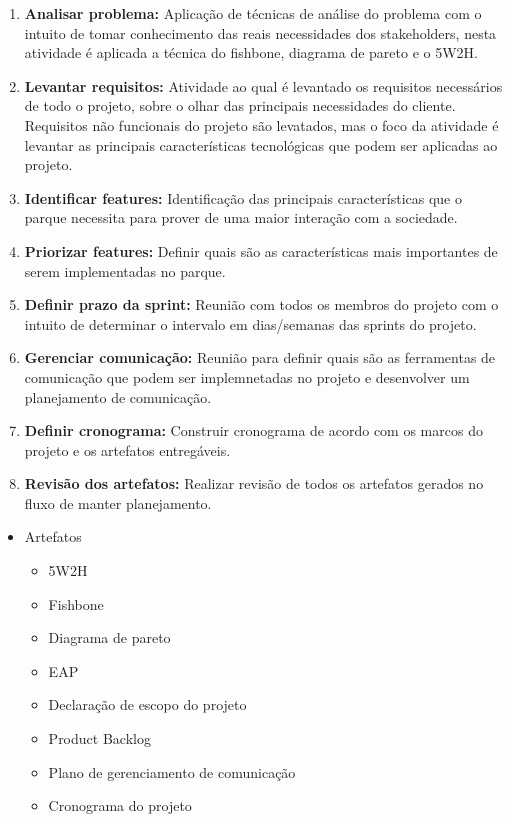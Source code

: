 \begin{enumerate}
	\item \textbf{Analisar problema:}  
	Aplicação de técnicas de análise do problema com o intuito de tomar conhecimento das reais necessidades dos stakeholders, nesta atividade é aplicada a técnica do fishbone, diagrama de pareto e o 5W2H.
	\item \textbf{Levantar requisitos:} 
	Atividade ao qual é levantado os requisitos necessários de todo o projeto, sobre o olhar das principais necessidades do cliente. Requisitos não funcionais do projeto são levatados, mas o foco da atividade é levantar as principais características tecnológicas que podem ser aplicadas ao projeto.
	\item \textbf{Identificar features:} 
	Identificação das principais características que o parque necessita para prover de uma maior interação com a sociedade. 
	\item \textbf{Priorizar features:} 
	Definir quais são as características mais importantes de serem implementadas no parque.
	\item \textbf{Definir prazo da sprint:} 
	Reunião com todos os membros do projeto com o intuito de determinar o intervalo em dias/semanas das sprints do projeto. 
	\item \textbf{Gerenciar comunicação:} 
	Reunião para definir quais são as ferramentas de comunicação que podem ser implemnetadas no projeto e desenvolver um planejamento de comunicação.
	\item \textbf{Definir cronograma:} 
	Construir cronograma de acordo com os marcos do projeto e os artefatos entregáveis. 
	\item \textbf{Revisão dos artefatos:} 
	Realizar revisão de todos os artefatos gerados no fluxo de manter planejamento. 
\end{enumerate}

\begin{itemize}
	\item Artefatos
	\begin{itemize}
		\item 5W2H
		\item Fishbone
		\item Diagrama de pareto
		\item EAP
		\item Declaração de escopo do projeto
		\item Product Backlog 
		\item Plano de gerenciamento de comunicação
		\item Cronograma do projeto
	\end{itemize}
\end{itemize}

